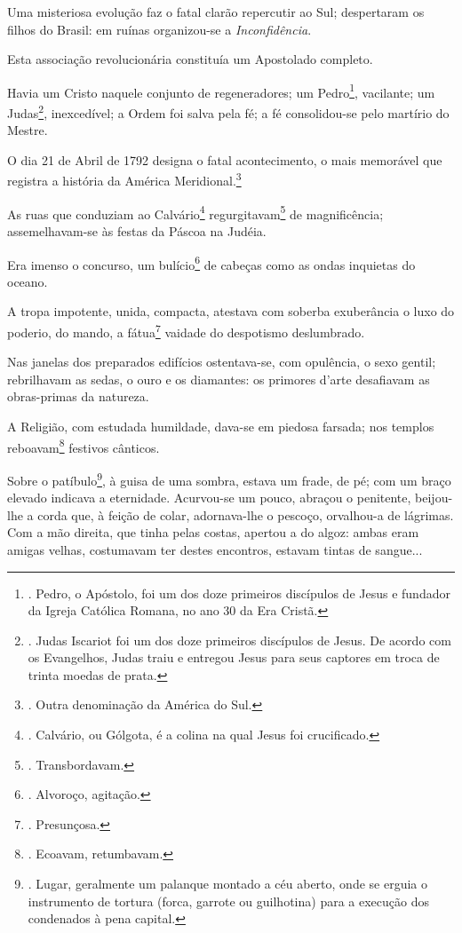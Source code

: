 Uma misteriosa evolução faz o fatal clarão repercutir ao Sul;
despertaram os filhos do Brasil: em ruínas organizou-se a
\emph{Inconfidência}.

Esta associação revolucionária constituía um Apostolado completo.

Havia um Cristo naquele conjunto de regeneradores; um Pedro\footnote{.
  Pedro, o Apóstolo, foi um dos doze primeiros discípulos de Jesus e
  fundador da Igreja Católica Romana, no ano 30 da Era Cristã.},
vacilante; um Judas\footnote{. Judas Iscariot foi um dos doze primeiros
  discípulos de Jesus. De acordo com os Evangelhos, Judas traiu e
  entregou Jesus para seus captores em troca de trinta moedas de prata.},
inexcedível; a Ordem foi salva pela fé; a fé consolidou-se pelo martírio
do Mestre.

O dia 21 de Abril de 1792 designa o fatal acontecimento, o mais
memorável que registra a história da América Meridional.\footnote{.
  Outra denominação da América do Sul.}

As ruas que conduziam ao Calvário\footnote{. Calvário, ou Gólgota, é a
  colina na qual Jesus foi crucificado.} regurgitavam\footnote{.
  Transbordavam.} de magnificência; assemelhavam-se às festas da Páscoa
na Judéia.

Era imenso o concurso, um bulício\footnote{. Alvoroço, agitação.} de
cabeças como as ondas inquietas do oceano.

A tropa impotente, unida, compacta, atestava com soberba exuberância o
luxo do poderio, do mando, a fátua\footnote{. Presunçosa.} vaidade do
despotismo deslumbrado.

Nas janelas dos preparados edifícios ostentava-se, com opulência, o sexo
gentil; rebrilhavam as sedas, o ouro e os diamantes: os primores d'arte
desafiavam as obras-primas da natureza.

A Religião, com estudada humildade, dava-se em piedosa farsada; nos
templos reboavam\footnote{. Ecoavam, retumbavam.} festivos cânticos.

Sobre o patíbulo\footnote{. Lugar, geralmente um palanque montado a céu
  aberto, onde se erguia o instrumento de tortura (forca, garrote ou
  guilhotina) para a execução dos condenados à pena capital.}, à guisa
de uma sombra, estava um frade, de pé; com um braço elevado indicava a
eternidade. Acurvou-se um pouco, abraçou o penitente, beijou-lhe a corda
que, à feição de colar, adornava-lhe o pescoço, orvalhou-a de lágrimas.
Com a mão direita, que tinha pelas costas, apertou a do algoz: ambas
eram amigas velhas, costumavam ter destes encontros, estavam tintas de
sangue...

